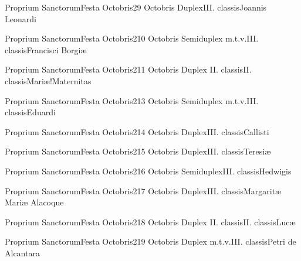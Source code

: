 \documentclass[liber-responsorialis_aestivus.tex]{subfiles}
\begin{document}
	{Proprium Sanctorum}{Festa Octobris}{2}{9 Octobris}
	{Duplex}{III. classis}{Joannis Leonardi}
	{\conprubric}
	{\respdetemp}

	{Proprium Sanctorum}{Festa Octobris}{2}{10 Octobris}
	{Semiduplex m.t.v.}{III. classis}{Francisci Borgiæ}
	{\conprubric}
	{\respdetemp}

	{Proprium Sanctorum}{Festa Octobris}{2}{11 Octobris}
	{Duplex II. classis}{II. classis}{Mariæ!Maternitas}
	{}
	{}

	{Proprium Sanctorum}{Festa Octobris}{2}{13 Octobris}
	{Semiduplex m.t.v.}{III. classis}{Eduardi}
	{\conprubric}
	{\respdetemp}

	{Proprium Sanctorum}{Festa Octobris}{2}{14 Octobris}
	{Duplex}{III. classis}{Callisti}
	{\umexrubric}
	{\respdetemp}

	{Proprium Sanctorum}{Festa Octobris}{2}{15 Octobris}
	{Duplex}{III. classis}{Teresiæ}
	{\vnrubric}
	{\respdetemp}

	{Proprium Sanctorum}{Festa Octobris}{2}{16 Octobris}
	{Semiduplex}{III. classis}{Hedwigis}
	{\nnrubric}
	{\respdetemp}

	{Proprium Sanctorum}{Festa Octobris}{2}{17 Octobris}
	{Duplex}{III. classis}{Margaritæ Mariæ Alacoque}
	{\vnrubric}
	{\respdetemp}

	{Proprium Sanctorum}{Festa Octobris}{2}{18 Octobris}
	{Duplex II. classis}{II. classis}{Lucæ}
	{}
	{}
\rubric{\apexrubric}

	{Proprium Sanctorum}{Festa Octobris}{2}{19 Octobris}
	{Duplex m.t.v.}{III. classis}{Petri de Alcantara}
	{\conprubric}
	{\respdetemp}
\end{document}
